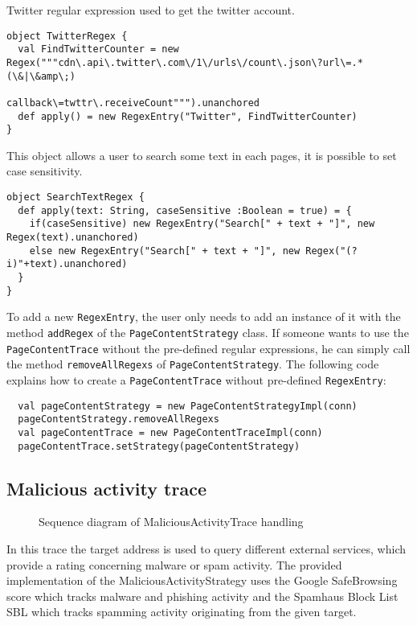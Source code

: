 \documentclass[
	a4paper,					10pt,							twoside,					openright,				notitlepage,			parskip=half,			]{scrreprt}
\begin{document}
Twitter regular expression used to get the twitter account.
\begin{lstlisting}
object TwitterRegex {
  val FindTwitterCounter = new Regex("""cdn\.api\.twitter\.com\/1\/urls\/count\.json\?url\=.*(\&|\&amp\;)
  									callback\=twttr\.receiveCount""").unanchored
  def apply() = new RegexEntry("Twitter", FindTwitterCounter)
}
\end{lstlisting}
\newpage
This object allows a user to search some text in each pages, it is possible to set case sensitivity.
\begin{lstlisting}
object SearchTextRegex {
  def apply(text: String, caseSensitive :Boolean = true) = {
    if(caseSensitive) new RegexEntry("Search[" + text + "]", new Regex(text).unanchored)
    else new RegexEntry("Search[" + text + "]", new Regex("(?i)"+text).unanchored)
  }
}
\end{lstlisting}

To add a new \verb|RegexEntry|, the user only needs to add an instance of it with the method \verb|addRegex|
of the \verb|PageContentStrategy| class. If someone wants to use the \verb|PageContentTrace| without the
pre-defined regular expressions, he can simply call the method \verb|removeAllRegexs| of \verb|PageContentStrategy|.
The following code explains how to create a \verb|PageContentTrace| without pre-defined \verb|RegexEntry|:
\begin{lstlisting}
  val pageContentStrategy = new PageContentStrategyImpl(conn)
  pageContentStrategy.removeAllRegexs
  val pageContentTrace = new PageContentTraceImpl(conn)
  pageContentTrace.setStrategy(pageContentStrategy)
\end{lstlisting}


\subsection{Malicious activity trace}
\label{subsec:api_libstruct_malicious}

\begin{figure}[H] 
\caption{Sequence diagram of MaliciousActivityTrace handling}
\label{fig:seq-malicioustrace}
\end{figure}

In this trace the target address is used to query different external services, which provide a rating 
concerning malware or spam activity. The provided implementation of the MaliciousActivityStrategy uses the 
Google SafeBrowsing score which tracks malware and phishing activity and the Spamhaus Block List \gls{SBL} which tracks
spamming activity originating from the given target. 
\end{document}
